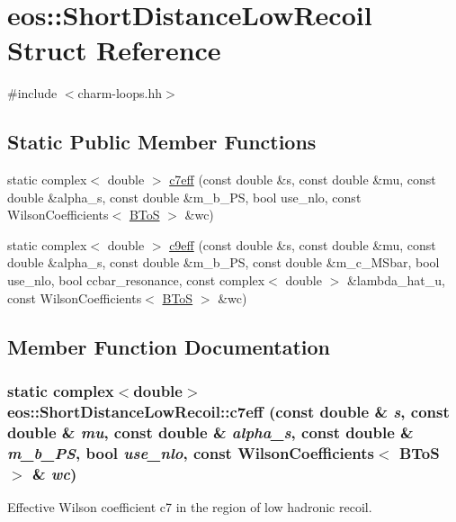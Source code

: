 \hypertarget{structeos_1_1ShortDistanceLowRecoil}{
\section{eos::ShortDistanceLowRecoil Struct Reference}
\label{structeos_1_1ShortDistanceLowRecoil}
}


{\ttfamily \#include $<$charm-\/loops.hh$>$}\subsection*{Static Public Member Functions}
\begin{DoxyCompactItemize}
\item 
static complex$<$ double $>$ \hyperlink{structeos_1_1ShortDistanceLowRecoil_abb30cc99b514a6610359a0869d4d4582}{c7eff} (const double \&s, const double \&mu, const double \&alpha\_\-s, const double \&m\_\-b\_\-PS, bool use\_\-nlo, const WilsonCoefficients$<$ \hyperlink{structeos_1_1BToS}{BToS} $>$ \&wc)
\item 
static complex$<$ double $>$ \hyperlink{structeos_1_1ShortDistanceLowRecoil_aaaee347f2e54c1edad33b9806c437cdd}{c9eff} (const double \&s, const double \&mu, const double \&alpha\_\-s, const double \&m\_\-b\_\-PS, const double \&m\_\-c\_\-MSbar, bool use\_\-nlo, bool ccbar\_\-resonance, const complex$<$ double $>$ \&lambda\_\-hat\_\-u, const WilsonCoefficients$<$ \hyperlink{structeos_1_1BToS}{BToS} $>$ \&wc)
\end{DoxyCompactItemize}


\subsection{Member Function Documentation}
\hypertarget{structeos_1_1ShortDistanceLowRecoil_abb30cc99b514a6610359a0869d4d4582}{
\subsubsection[{c7eff}]{\setlength{\rightskip}{0pt plus 5cm}static complex$<$double$>$ eos::ShortDistanceLowRecoil::c7eff (const double \& {\em s}, \/  const double \& {\em mu}, \/  const double \& {\em alpha\_\-s}, \/  const double \& {\em m\_\-b\_\-PS}, \/  bool {\em use\_\-nlo}, \/  const WilsonCoefficients$<$ {\bf BToS} $>$ \& {\em wc})}}
\label{structeos_1_1ShortDistanceLowRecoil_abb30cc99b514a6610359a0869d4d4582}
Effective Wilson coefficient c7 in the region of low hadronic recoil.


